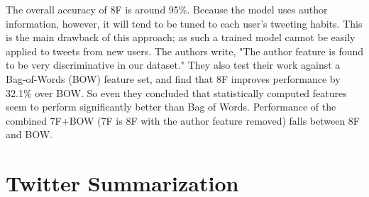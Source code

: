 The overall accuracy of 8F is around 95\%. Because the model uses author information, however, it will tend to be tuned to each user's tweeting habits. This is the main drawback of this approach; as such a trained model cannot be easily applied to tweets from new users. The authors write, "The author feature is found to be very discriminative in our dataset." They also test their work against a Bag-of-Words (BOW) feature set, and find that 8F improves performance by 32.1\% over BOW. So even they concluded that statistically computed features seem to perform significantly better than Bag of Words. Performance of the combined 7F+BOW (7F is 8F with the author feature removed) falls between 8F and BOW. 

\section{Twitter Summarization}
